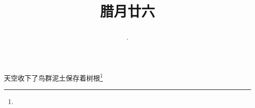 \title{\date[d=5,m=2,y=2024][year:cn-y,年,month:cn,day:cn,日,·,weekday]·腊月廿六 }
天空收下了鸟群泥土保存着树根\footnote{ }

